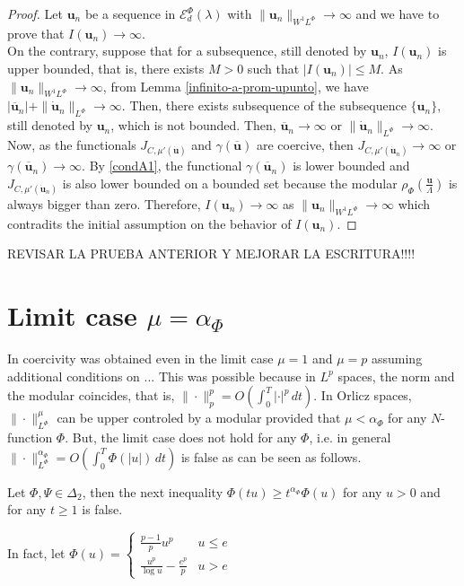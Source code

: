 \documentclass[twoside]{article}
\theoremstyle{remark}
\newcommand{\orlnor}{\|_{L^{\Phi}}}
\newcommand{\lphi}{L^{\Phi}}
\newcommand{\sobnor}{\|_{W^{1}\lphi}}
\newcommand{\domi}{\mathcal{E}^{\Phi}_d(\lambda)}
\renewcommand{\b}[1]{\boldsymbol{#1}}
\renewcommand{\leq}{\leqslant}
\begin{document}
\begin{proof}
Let $\b{u}_n$ be  a sequence in $\domi$ with 
$\|\b{u}_n\sobnor\to\infty$ and we have to prove that $I(\b{u}_n)\to\infty$. 
\\
On the contrary, suppose  that for a subsequence, 
still denoted by $\b{u}_n$, $I(\b{u}_n)$ is upper bounded, that is, there exists $M>0$ such that $|I(\b{u}_{n})|\leq M$. 
As $\|\b{u}_n\sobnor\to\infty$, from Lemma \ref{infinito-a-prom-upunto},  we have $|\overline{\b{u}}_n|+\|\b{\dot{u}}_n\orlnor\to \infty$.
Then, there exists subsequence of the subsequence $\{\b{u}_n\}$, still denoted by $\b{u}_n$, which is not bounded.
Then, 
$\b{\overline u}_n\to \infty$ or $\|\b{\dot{u}}_n\orlnor\to \infty$.
Now, as the functionals $J_{C,\mu'(\b{\dot u})}$ and $\gamma(\b{\overline{u}})$ are coercive, then 
$J_{C,\mu'(\b{\dot u}_n)} \to \infty$ or $\gamma(\b{\overline{u}}_n)\to \infty$.
By \eqref{condA1}, the functional $\gamma(\b{\overline{u}}_n)$ is lower bounded and 
$J_{C,\mu'(\b{\dot u}_n)}$ is also lower bounded on a bounded set because the modular $\rho_{\Phi}\left(\frac{\b{u}}{\Lambda}\right)$ is always bigger than zero. 
Therefore,  $I(\b{u}_n)\to\infty$ as $\|\b{u}_n\sobnor\to\infty$ which contradits the initial assumption on the behavior of $I(\b{u}_n)$. 
\end{proof}
REVISAR LA PRUEBA ANTERIOR Y MEJORAR LA ESCRITURA!!!!

\section{Limit case $\mu=\alpha_{\Phi}$}

In \cite{} coercivity was obtained even in the limit case $\mu=1$ and $\mu=p$ assuming additional conditions on ... 
This was possible because in $L^p$ spaces, the norm and the modular coincides, that is, $\|\cdot\|_p^p=O(\int_0^T |\cdot|^p\,dt)$.
In Orlicz spaces, $\|\cdot\orlnor^\mu$ can be upper controled by a modular provided that $\mu<\alpha_{\Phi}$ for any
$N$-function $\Phi$. But,  the limit case does  not hold for any $\Phi$, i.e. in general $\|\cdot\orlnor^{\alpha_{\Phi}}=O(\int_0^T \Phi(|u|)\,dt)$ is false as can be seen as follows.


Let $\Phi, \Psi \in \Delta_2$, then the next inequality $\Phi(tu)\geq t^{\alpha_{\Phi}}\Phi(u)$ for any $u>0$ and for any $t\geq 1$ is false.

In fact, let 
$\Phi(u)=
\left\{
\begin{array}{ll}
\frac{p-1}{p}u^p&u\leq e
\\
\frac{u^p}{\log u}-\frac{e^p}{p}&u>e
\end{array}
\right.$
\end{document}
